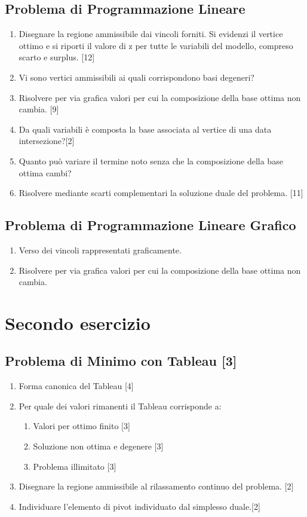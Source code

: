 \documentclass[\main/main.tex]{subfiles}
\begin{document}
\subsection{Problema di Programmazione Lineare}
\begin{enumerate}
  \item Disegnare la regione ammissibile dai vincoli forniti. Si evidenzi il vertice ottimo e si riporti il valore di z per tutte le variabili del modello, compreso scarto e surplus. [12]
  \item Vi sono vertici ammissibili ai quali corrispondono basi degeneri?
  \item Risolvere per via grafica valori per cui la composizione della base ottima non cambia. [9]
  \item Da quali variabili è composta la base associata al vertice di una data intersezione?[2]
  \item Quanto può variare il termine noto senza che la composizione della base ottima cambi?
  \item Risolvere mediante scarti complementari la soluzione duale del problema. [11]
\end{enumerate}

\subsection{Problema di Programmazione Lineare Grafico}
\begin{enumerate}
  \item Verso dei vincoli rappresentati graficamente.
  \item Risolvere per via grafica valori per cui la composizione della base ottima non cambia.
\end{enumerate}


\section{Secondo esercizio}

\subsection{Problema di Minimo con Tableau [3]}

\begin{enumerate}
  \item Forma canonica del Tableau [4]
  \item Per quale dei valori rimanenti il Tableau corrisponde a:
        \begin{enumerate}
          \item Valori per ottimo finito [3]
          \item Soluzione non ottima e degenere [3]
          \item Problema illimitato [3]
        \end{enumerate}
  \item Disegnare la regione ammissibile al rilassamento continuo del problema. [2]
  \item Individuare l'elemento di pivot individuato dal simplesso duale.[2]
\end{enumerate}
\end{document}
